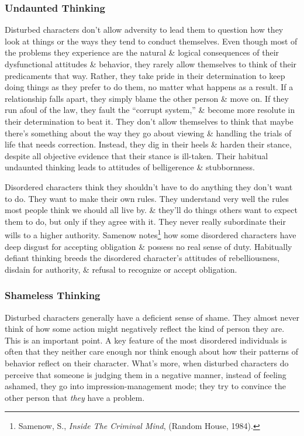 \documentclass{article}
\numberwithin{equation}{section}
\begin{document}
\subsubsection{Undaunted Thinking}
Disturbed characters don't allow adversity to lead them to question how they look at things or the ways they tend to conduct themselves. Even though most of the problems they experience are the natural \& logical consequences of their dysfunctional attitudes \& behavior, they rarely allow themselves to think of their predicaments that way. Rather, they take pride in their determination to keep doing things as they prefer to do them, no matter what happens as a result. If a relationship falls apart, they simply blame the other person \& move on. If they run afoul of the law, they fault the ``corrupt system,'' \& become more resolute in their determination to beat it. They don't allow themselves to think that maybe there's something about the way they go about viewing \& handling the trials of life that needs correction. Instead, they dig in their heels \& harden their stance, despite all objective evidence that their stance is ill-taken. Their habitual undaunted thinking leads to attitudes of belligerence \& stubbornness.

Disordered characters think they shouldn't have to do anything they don't want to do. They want to make their own rules. They understand very well the rules most people think we should all live by. \& they'll do things others want to expect them to do, but only if they agree with it. They never really subordinate their wills to a higher authority. Samenow notes\footnote{Samenow, S., {\it Inside The Criminal Mind}, (Random House, 1984).} how some disordered characters have deep disgust for accepting obligation \& possess no real sense of duty. Habitually defiant thinking breeds the disordered character's attitudes of rebelliousness, disdain for authority, \& refusal to recognize or accept obligation.

\subsubsection{Shameless Thinking}
Disturbed characters generally have a deficient sense of shame. They almost never think of how some action might negatively reflect the kind of person they are. This is an important point. A key feature of the most disordered individuals is often that they neither care enough nor think enough about how their patterns of behavior reflect on their character. What's more, when disturbed characters do perceive that someone is judging them in a negative manner, instead of feeling ashamed, they go into impression-management mode; they try to convince the other person that \textit{they} have a problem.
\end{document}
